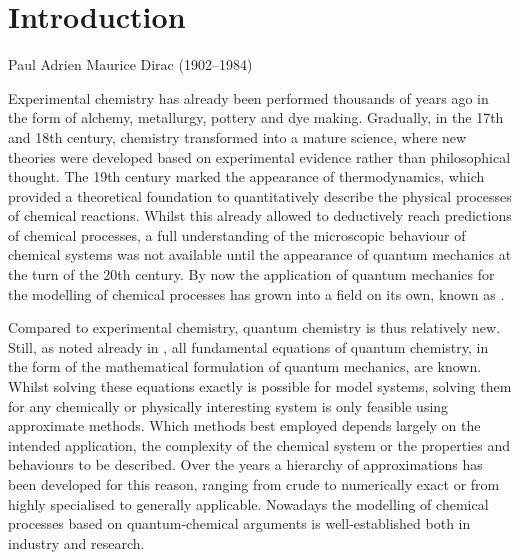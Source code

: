 \chapter{Introduction}
\label{ch:Intro}
{Paul Adrien Maurice Dirac (1902--1984)}

\noindent
Experimental chemistry
has already been performed thousands of years ago
in the form of alchemy, metallurgy, pottery and dye making.
Gradually,
in the 17th and 18th century,
chemistry transformed into a mature science,
where new theories were developed based on
experimental evidence rather than philosophical thought.
The 19th century marked the appearance of thermodynamics,
which provided a theoretical foundation
to quantitatively describe the physical processes of chemical reactions.
Whilst this already allowed to deductively reach predictions of chemical processes,
a full understanding of the microscopic behaviour
of chemical systems was not available until the appearance
of quantum mechanics at the turn of the 20th century.
By now the application of quantum mechanics for the modelling of chemical processes
has grown into a field on its own, known as .

Compared to experimental chemistry, quantum chemistry is thus relatively new.
Still, as \citet{Dirac1929} noted already in \citeyear{Dirac1929},
all fundamental equations of quantum chemistry,
in the form of the mathematical formulation of quantum mechanics, are known.
Whilst solving these equations exactly is possible for model systems,
solving them for any chemically or physically
interesting system is only feasible using approximate methods.
Which methods best employed depends largely on the intended application,
\ie the complexity of the chemical system
or the properties and behaviours to be described.
Over the years a hierarchy of approximations has been developed for this reason,
ranging from crude to numerically exact
or from highly specialised to generally applicable.
Nowadays the modelling of chemical processes
based on quantum-chemical arguments
is well-established both in industry and research.

